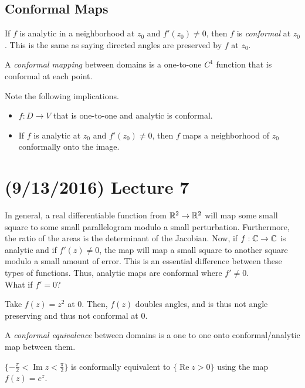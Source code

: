 \documentclass[11pt,leqno,oneside]{amsart}
\numberwithin{thm}{section}
\renewcommand{\Re}{\operatorname{Re}}
\renewcommand{\Im}{\operatorname{Im}}
\begin{document}
\subsection*{Conformal Maps}
\begin{defn}
    If $f$ is analytic in a neighborhood at $z_0$ and $f'(z_0) \neq 0$, then
    $f$ is \emph{conformal} at $z_0$. This is the same as saying directed
    angles are preserved by $f$ at $z_0$.
\end{defn}
\begin{defn}
    A \emph{conformal mapping} between domains is a one-to-one $C^1$ function
    that is conformal at each point.
\end{defn}
Note the following implications.
\begin{itemize}
    \item $f: D \to V$ that is one-to-one and analytic is conformal.
    \item If $f$ is analytic at $z_0$ and $f'(z_0) \neq 0$, then $f$ maps a
        neighborhood of $z_0$ conformally onto the image.
\end{itemize}

\section{(9/13/2016) Lecture 7}
In general, a real differentiable function from ${\mathbb R}^2 \to {\mathbb R}^2$ will map some
small square to some small parallelogram modulo a small
perturbation. Furthermore, the ratio of the areas is the determinant of the
Jacobian. Now, if $f: {\mathbb C} \to {\mathbb C}$ is analytic and if $f'(z) \neq 0$, the map will
map a small square to another square modulo a small amount of error. This is an
essential difference between these types of functions. Thus, analytic maps are
conformal where $f' \neq 0$. \\

What if $f' = 0$?
\begin{example}
  Take $f(z) = z^2$ at 0. Then, $f(z)$ doubles angles, and is thus not angle
  preserving and thus not conformal at 0.
\end{example}

\begin{defn}
  A \emph{conformal equivalence} between domains is a one to one onto
  conformal/analytic map between them.
\end{defn}
\begin{example}
  $\{-\frac{\pi}{2} < \Im z < \frac{\pi}{2}\}$ is conformally equivalent to
  $\{\Re z > 0\}$ using the map $f(z) = e^z$.
\end{example}
\end{document}
